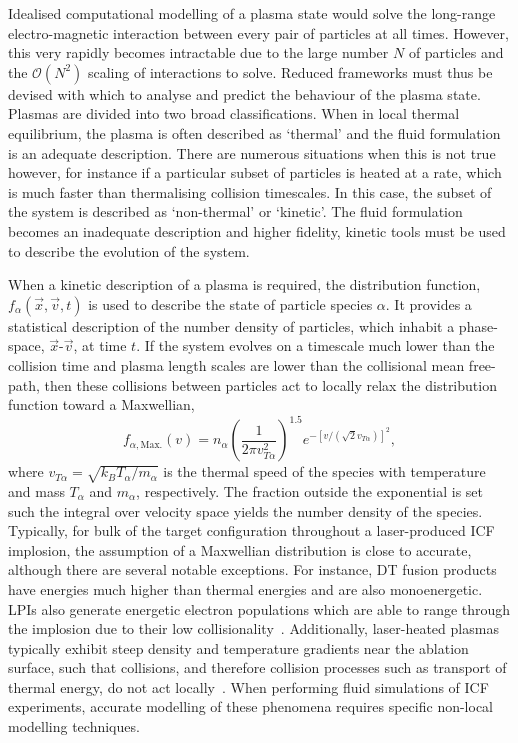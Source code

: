 Idealised computational modelling of a plasma state would solve the long-range electro-magnetic interaction between every pair of particles at all times.
However, this very rapidly becomes intractable due to the large number $N$ of particles and the $\mathcal{O}(N^2)$ scaling of interactions to solve.
Reduced frameworks must thus be devised with which to analyse and predict the behaviour of the plasma state.
Plasmas are divided into two broad classifications.
When in local thermal equilibrium, the plasma is often described as `thermal' and the fluid formulation is an adequate description.
There are numerous situations when this is not true however, for instance if a particular subset of particles is heated at a rate, which is much faster than thermalising collision timescales.
In this case, the subset of the system is described as `non-thermal' or `kinetic'.
The fluid formulation becomes an inadequate description and higher fidelity, kinetic tools must be used to describe the evolution of the system.

When a kinetic description of a plasma is required, the distribution function, $f_{\alpha}(\vec{x},\vec{v},t)$ is used to describe the state of particle species $\alpha$.
It provides a statistical description of the number density of particles, which inhabit a phase-space, $\vec{x}$-$\vec{v}$, at time $t$.
If the system evolves on a timescale much lower than the collision time and plasma length scales are lower than the collisional mean free-path, then these collisions between particles act to locally relax the distribution function toward a Maxwellian,
\begin{equation}
    \label{eq:theory_maxwellian}
    f_{\alpha,\text{Max.}}(v) = n_{\alpha} {\left( \frac{1}{2\pi v_{T\alpha}^2} \right)}^{1.5} e^{-\left [ v/ \left (\sqrt{2} v_{T\alpha} \right ) \right ]^2},
\end{equation}
where $v_{T\alpha}=\sqrt{k_B T_{\alpha}/m_{\alpha}}$ is the thermal speed of the species with temperature and mass $T_{\alpha}$ and $m_{\alpha}$, respectively.
The fraction outside the exponential is set such the integral over velocity space yields the number density of the species.
Typically, for bulk of the target configuration throughout a laser-produced \ac{ICF} implosion, the assumption of a Maxwellian distribution is close to accurate, although there are several notable exceptions.
For instance, DT fusion products have energies much higher than thermal energies and are also monoenergetic.
\ac{LPIs} also generate energetic electron populations which are able to range through the implosion due to their low collisionality~\cite{barlow_role_2022}.
Additionally, laser-heated plasmas typically exhibit steep density and temperature gradients near the ablation surface, such that collisions, and therefore collision processes such as transport of thermal energy, do not act locally~\cite{epperlein_practical_1991}.
When performing fluid simulations of \ac{ICF} experiments, accurate modelling of these phenomena requires specific non-local modelling techniques.

